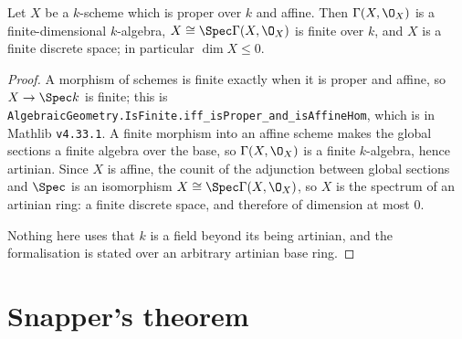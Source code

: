\begin{lemma}
\label{lem:deg-proper-affine-finite}
\leanok
Let $X$ be a $k$-scheme which is proper over $k$ and affine.  Then
$\Gamma(X,\O_X)$ is a finite-dimensional $k$-algebra, $X\cong\Spec
\Gamma(X,\O_X)$ is finite over $k$, and $X$ is a finite discrete space; in
particular $\dim X\leq0$.
\end{lemma}
\begin{proof}
\leanok
A morphism of schemes is finite exactly when it is proper and affine, so
$X\to\Spec k$ is finite; this is
\texttt{AlgebraicGeometry.IsFinite.iff\_isProper\_and\_isAffineHom}, which is
in Mathlib \texttt{v4.33.1}.  A finite morphism into an affine scheme makes the
global sections a finite algebra over the base, so $\Gamma(X,\O_X)$ is a finite
$k$-algebra, hence artinian.  Since $X$ is affine, the counit of the adjunction
between global sections and $\Spec$ is an isomorphism
$X\cong\Spec\Gamma(X,\O_X)$, so $X$ is the spectrum of an artinian ring: a
finite discrete space, and therefore of dimension at most $0$.

Nothing here uses that $k$ is a field beyond its being artinian, and the
formalisation is stated over an arbitrary artinian base ring.
\end{proof}

\section{Snapper's theorem}\label{sec:deg-snapper}

